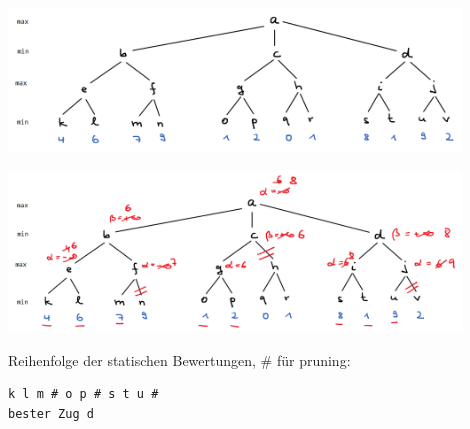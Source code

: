 \begin{frame}[fragile]
\includegraphics[width=12cm]{bild14.png} 



\end{frame}

\begin{frame}[fragile]
\includegraphics[width=12cm]{bild15.png} 

Reihenfolge der statischen Bewertungen, \# für pruning:
\begin{lstlisting}
k l m # o p # s t u # 
bester Zug d
\end{lstlisting} 
\end{frame}



 